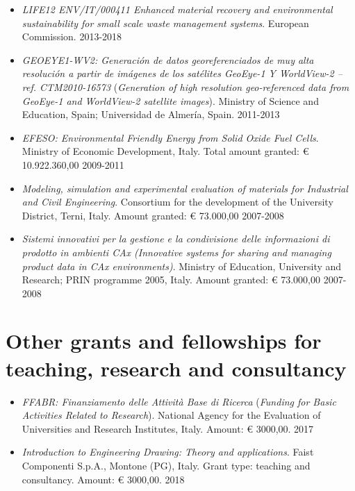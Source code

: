 \documentclass[11pt]{article}
\begin{document}
\begin{itemize}
	\item \emph{LIFE12 ENV/IT/000411 Enhanced material recovery and environmental sustainability for small scale waste management systems}. European Commission. \hfill 2013-2018
	
	\item \emph{GEOEYE1-WV2: Generación de datos georeferenciados de muy alta resolución a partir de imágenes de los satélites GeoEye-1 Y WorldView-2 -- ref. CTM2010-16573} (\emph{Generation of high resolution geo-referenced data from GeoEye-1 and WorldView-2 satellite images}). Ministry of Science and Education, Spain; Universidad de Almería, Spain. \hfill 2011-2013
	
	\item \emph{EFESO: Environmental Friendly Energy from Solid Oxide Fuel Cells}. Ministry of Economic Development, Italy. Total amount granted: € 10.922.360,00 \hfill 2009-2011
	
	\item \emph{Modeling, simulation and experimental evaluation of materials for Industrial and Civil Engineering}. Consortium for the development of the University District, Terni, Italy. Amount granted: € 73.000,00 \hfill 2007-2008
	
	\item \emph{Sistemi innovativi per la gestione e la condivisione delle informazioni di prodotto in ambienti CAx (Innovative systems for sharing and managing product data in CAx environments)}. Ministry of Education, University and Research; PRIN programme 2005, Italy. Amount granted: € 73.000,00 \mbox{} \hfill 2007-2008

\end{itemize}

\section*{Other grants and fellowships for teaching, research and consultancy}

\begin{itemize}
	\item \emph{FFABR: Finanziamento delle Attività Base di Ricerca} (\emph{Funding for Basic Activities Related to Research}). National Agency 
for the Evaluation of Universities and Research Institutes, Italy. Amount: € 3000,00. \hfill 2017
\end{itemize}

\begin{itemize}
	\item \emph{Introduction to Engineering Drawing: Theory and applications}. Faist Componenti S.p.A., Montone (PG), Italy. Grant type: teaching and consultancy. Amount: € 3000,00. \hfill 2018
\end{itemize}
\end{document}
